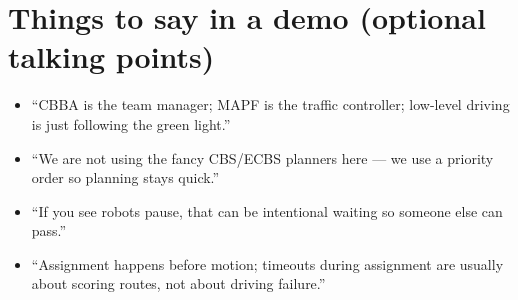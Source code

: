 \documentclass[11pt,a4paper]{article}
\begin{document}
\section{Things to say in a demo (optional talking points)}

\begin{itemize}[leftmargin=*]
  \item ``CBBA is the team manager; MAPF is the traffic controller; low-level
        driving is just following the green light.''
  \item ``We are not using the fancy CBS/ECBS planners here --- we use a
        priority order so planning stays quick.''
  \item ``If you see robots pause, that can be intentional waiting so someone
        else can pass.''
  \item ``Assignment happens before motion; timeouts during assignment are
        usually about scoring routes, not about driving failure.''
\end{itemize}
\end{document}
